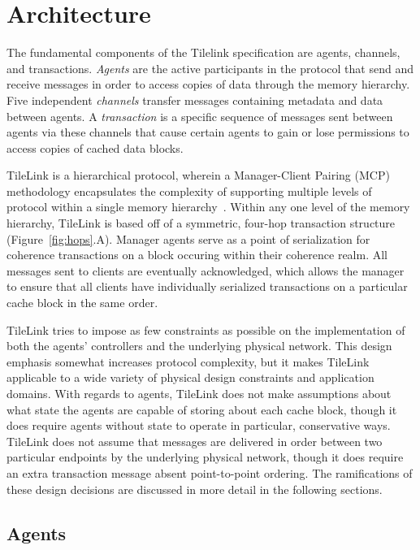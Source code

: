 \section{Architecture}
\label{s.arch}

The fundamental components of the Tilelink specification are agents, channels, and transactions.
{\em Agents} are the active participants in the protocol that send and receive messages in order to access copies of data through the memory hierarchy.
Five independent {\em channels} transfer messages containing metadata and data between agents.
A {\em transaction} is a specific sequence of messages sent between agents via these channels
that cause certain agents to gain or lose permissions to access copies of cached data blocks.

TileLink is a hierarchical protocol, wherein a Manager-Client Pairing (MCP) methodology encapsulates the complexity of supporting
multiple levels of protocol within a single memory hierarchy~\cite{beu2011manager}.
Within any one level of the memory hierarchy, TileLink is based off of a symmetric, four-hop transaction structure (Figure~\ref{fig:hops}.A).
Manager agents serve as a point of serialization for coherence transactions on a block occuring within their coherence realm.
All messages sent to clients are eventually acknowledged, which allows the manager to ensure that all clients have
individually serialized transactions on a particular cache block in the same order.

TileLink tries to impose as few constraints as possible on the implementation of both the agents' controllers and the underlying physical network.
This design emphasis somewhat increases protocol complexity, but it makes TileLink applicable to a wide variety of physical design constraints and application domains.
With regards to agents, TileLink does not make assumptions about what state the agents are capable of storing about each cache block,
though it does require agents without state to operate in particular, conservative ways.
TileLink does not assume that messages are delivered in order between two particular endpoints by the underlying physical network,
though it does require an extra transaction message absent point-to-point ordering.
The ramifications of these design decisions are discussed in more detail in the following sections.

\subsection{Agents}

